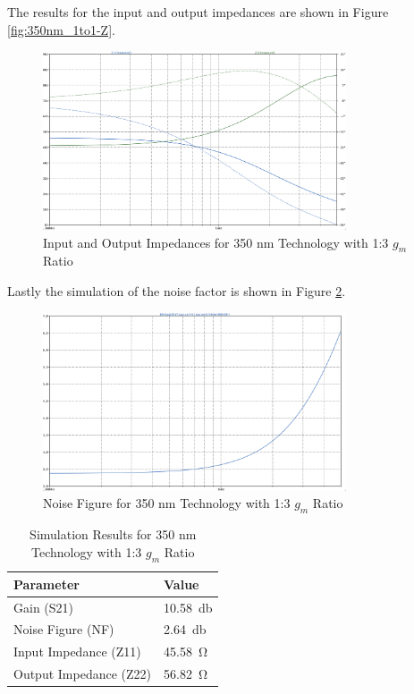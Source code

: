 The results for the input and output impedances are shown in Figure \ref{fig:350nm_1to1-Z}.

\begin{figure}[H]
    \centering
    \includegraphics[width=0.8\textwidth]{Images/3501to3ZParam.png}
    \caption{Input and Output Impedances for 350 nm Technology with 1:3 $g_m$ Ratio}
    \label{fig:350nm_1ton-Z}
\end{figure}

Lastly the simulation of the noise factor is shown in Figure \ref{fig:350nm_1ton-NF}.
\begin{figure}[H]
    \centering
    \includegraphics[width=0.8\textwidth]{Images/3501to3Noise.png}
    \caption{Noise Figure for 350 nm Technology with 1:3 $g_m$ Ratio}
    \label{fig:350nm_1ton-NF}
\end{figure}

\begin{table}[H]
    \centering
    \caption{Simulation Results for 350 nm Technology with 1:3 $g_m$ Ratio}
    \begin{tabularx}{\textwidth}{>{\centering\arraybackslash}X >{\centering\arraybackslash}X }
        \toprule
        \textbf{Parameter} & \textbf{Value}\\
        \midrule
        Gain (S21) & \SI{10.58}{\decibel} \\
        \midrule
        Noise Figure (NF) & \SI{2.64}{\decibel} \\
        \midrule
        Input Impedance (Z11) & \SI{45.58}{\ohm} \\
        \midrule
        Output Impedance (Z22) & \SI{56.82}{\ohm} \\
        \bottomrule
    \end{tabularx}
    \label{tab:350nm_1ton_results}
\end{table}

